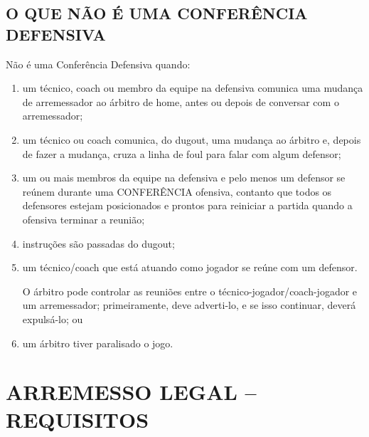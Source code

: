 \begin{multicols}{2}
	
	\subsection{O QUE NÃO \'E UMA CONFERÊNCIA DEFENSIVA }
	
	
	N\~ao \'e uma Confer\^encia Defensiva  quando: 
	
	\begin{enumerate}[label=\alph*)]
		\item um t\'ecnico, \gls{coach} ou membro da equipe na defensiva comunica uma mudan\c{c}a de arremessador ao \'arbitro de \gls{home}, antes ou depois de conversar com o arremessador; 
		
		\item  um t\'ecnico ou \gls{coach} comunica, do \Gls{dugout}, uma mudan\c{c}a ao \'arbitro e, depois de fazer a mudan\c{c}a, cruza a linha de \gls{foul} para falar com algum defensor; 
		
		\item  um ou mais membros da equipe na defensiva e pelo menos um defensor se re\'unem durante uma CONFERÊNCIA ofensiva, contanto que todos os defensores estejam posicionados e prontos para reiniciar a partida quando a ofensiva terminar a reuni\~ao; 
		
		\item  instru\c{c}\~oes s\~ao passadas do \Gls{dugout}; 
		
		\item  um t\'ecnico/\gls{coach} que est\'a atuando como jogador se re\'une com um defensor. 
		
		O \'arbitro pode controlar as reuni\~oes entre o t\'ecnico-jogador/\gls{coach}-jogador e um arremessador; primeiramente, deve adverti-lo, e se isso continuar, dever\'a expuls\'a-lo; 
		ou 
		
		\item  um \'arbitro tiver paralisado o jogo. 
	\end{enumerate}
	
\end{multicols}
	\section{ARREMESSO LEGAL -- REQUISITOS} 

